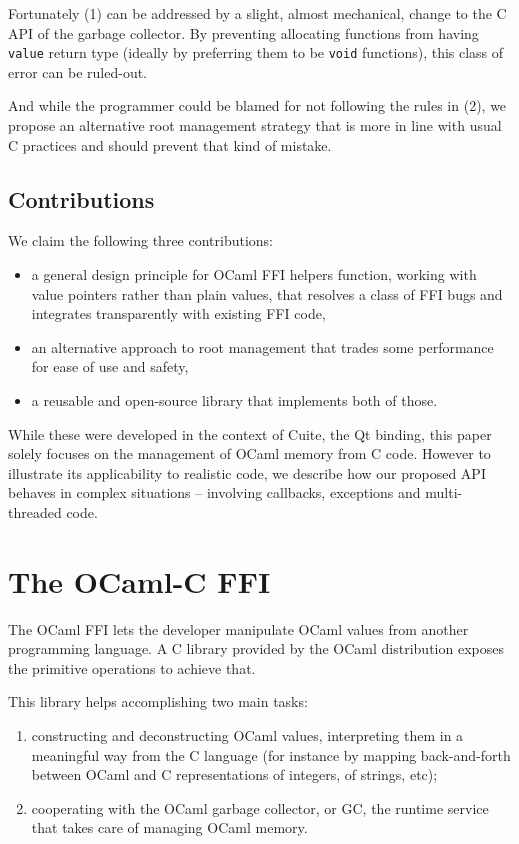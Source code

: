 \documentclass[a4paper]{easychair}
\begin{document}
Fortunately (1) can be addressed by a slight, almost mechanical, change
to the C API of the garbage collector. By preventing allocating
functions from having \texttt{value} return type (ideally by preferring
them to be \texttt{void} functions), this class of error can be
ruled-out.

And while the programmer could be blamed for not following the rules in
(2), we propose an alternative root management strategy that is more in
line with usual C practices and should prevent that kind of mistake.

\hypertarget{contributions}{%
\subsection{Contributions}\label{contributions}}

We claim the following three contributions:

\begin{itemize}
\tightlist
\item
  a general design principle for OCaml FFI helpers function, working
  with value pointers rather than plain values, that resolves a class of
  FFI bugs and integrates transparently with existing FFI code,
\item
  an alternative approach to root management that trades some
  performance for ease of use and safety,
\item
  a reusable and open-source library that implements both of those.
\end{itemize}

While these were developed in the context of Cuite, the Qt binding, this
paper solely focuses on the management of OCaml memory from C code.
However to illustrate its applicability to realistic code, we describe
how our proposed API behaves in complex situations -- involving
callbacks, exceptions and multi-threaded code.

\hypertarget{the-ocaml-c-ffi}{%
\section{The OCaml-C FFI}\label{the-ocaml-c-ffi}}

The OCaml FFI lets the developer manipulate OCaml values from another
programming language. A C library provided by the OCaml distribution
exposes the primitive operations to achieve that.

This library helps accomplishing two main tasks:

\begin{enumerate}
\def\labelenumi{\arabic{enumi}.}
\tightlist
\item
  constructing and deconstructing OCaml values, interpreting them in a
  meaningful way from the C language (for instance by mapping
  back-and-forth between OCaml and C representations of integers, of
  strings, etc);
\item
  cooperating with the OCaml garbage collector, or GC, the runtime
  service that takes care of managing OCaml memory.
\end{enumerate}
\end{document}

